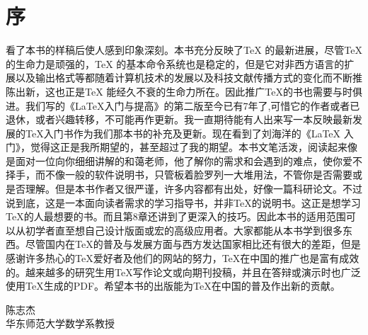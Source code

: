 \chapter{序}

看了本书的样稿后使人感到印象深刻。本书充分反映了\TeX{} 的最新进展，尽管\TeX{} 的生命力是顽强的，\TeX{}  的基本命令系统也是稳定的，但是它对非西方语言的扩展以及输出格式等都随着计算机技术的发展以及科技文献传播方式的变化而不断推陈出新，这也正是\TeX{} 能经久不衰的生命力所在。因此推广\TeX{}的书也需要与时俱进。我们写的《\LaTeX 入门与提高》的第二版至今已有7年了,可惜它的作者或者已退休，或者兴趣转移，不可能再作更新。我一直期待能有人出来写一本反映最新发展的\TeX 入门书作为我们那本书的补充及更新。现在看到了刘海洋的《\LaTeX{} 入门》，觉得这正是我所期望的，甚至超过了我的期望。本书文笔活泼，阅读起来像是面对一位向你细细讲解的和蔼老师，他了解你的需求和会遇到的难点，使你爱不择手，而不像一般的软件说明书，只管板着脸罗列一大堆用法，不管你是否需要或是否理解。但是本书作者又很严谨，许多内容都有出处，好像一篇科研论文。不过说到底，这是一本面向读者需求的学习指导书，并非\TeX 的说明书。这正是想学习\TeX 的人最想要的书。而且第8章还讲到了更深入的技巧。因此本书的适用范围可以从初学者直至想自己设计版面或宏的高级应用者。大家都能从本书学到很多东西。尽管国内在\TeX 的普及与发展方面与西方发达国家相比还有很大的差距，但是感谢许多热心的\TeX 爱好者及他们的网站的努力，\TeX 在中国的推广也是富有成效的。越来越多的研究生用\TeX 写作论文或向期刊投稿，并且在答辩或演示时也广泛使用\TeX 生成的PDF。希望本书的出版能为\TeX 在中国的普及作出新的贡献。

\bigskip

\begin{flushright}
    \parbox{\widthof{华东师范大学数学系教授}}{%
    陈志杰\\
    华东师范大学数学系教授\\
    \raisebox{-1ex}{2013年3月5日}}
\end{flushright}